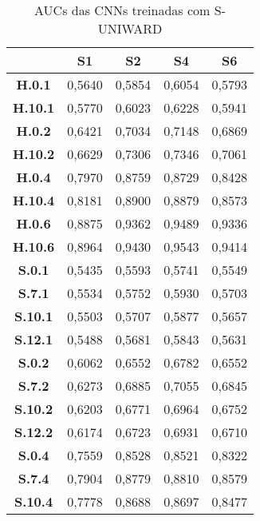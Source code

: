 \begin{apendicesenv}
\begin{table}[!htb]
\centering
\caption{AUCs das CNNs treinadas com S-UNIWARD}
\begin{tabular}{|c|c|c|c|c|}
\hline
\textbf{}       & \textbf{S1} & \textbf{S2} & \textbf{S4} & \textbf{S6} \\ \hline
\textbf{H.0.1}  & 0,5640      & 0,5854      & 0,6054      & 0,5793      \\ \hline
\textbf{H.10.1} & 0,5770      & 0,6023      & 0,6228      & 0,5941      \\ \hline
\textbf{H.0.2}  & 0,6421      & 0,7034      & 0,7148      & 0,6869      \\ \hline
\textbf{H.10.2} & 0,6629      & 0,7306      & 0,7346      & 0,7061      \\ \hline
\textbf{H.0.4}  & 0,7970      & 0,8759      & 0,8729      & 0,8428      \\ \hline
\textbf{H.10.4} & 0,8181      & 0,8900      & 0,8879      & 0,8573      \\ \hline
\textbf{H.0.6}  & 0,8875      & 0,9362      & 0,9489      & 0,9336      \\ \hline
\textbf{H.10.6} & 0,8964      & 0,9430      & 0,9543      & 0,9414      \\ \hline
\textbf{S.0.1}  & 0,5435      & 0,5593      & 0,5741      & 0,5549      \\ \hline
\textbf{S.7.1}  & 0,5534      & 0,5752      & 0,5930      & 0,5703      \\ \hline
\textbf{S.10.1} & 0,5503      & 0,5707      & 0,5877      & 0,5657      \\ \hline
\textbf{S.12.1} & 0,5488      & 0,5681      & 0,5843      & 0,5631      \\ \hline
\textbf{S.0.2}  & 0,6062      & 0,6552      & 0,6782      & 0,6552      \\ \hline
\textbf{S.7.2}  & 0,6273      & 0,6885      & 0,7055      & 0,6845      \\ \hline
\textbf{S.10.2} & 0,6203      & 0,6771      & 0,6964      & 0,6752      \\ \hline
\textbf{S.12.2} & 0,6174      & 0,6723      & 0,6931      & 0,6710      \\ \hline
\textbf{S.0.4}  & 0,7559      & 0,8528      & 0,8521      & 0,8322      \\ \hline
\textbf{S.7.4}  & 0,7904      & 0,8779      & 0,8810      & 0,8579      \\ \hline
\textbf{S.10.4} & 0,7778      & 0,8688      & 0,8697      & 0,8477      \\ \hline

\end{tabular}
\end{table}
\end{apendicesenv}
